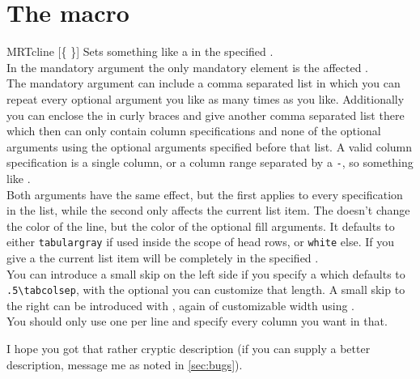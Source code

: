 \section{The  macro}\label{sec:tab:cline}%
\begin{describemacro}{MRTcline}%
  [\{\meta{*}%
  \}]
  Sets something like a  in the specified .
  \\[\parskip]
  In the mandatory argument the only mandatory element is the affected
  .
  \\[\parskip]
  The mandatory argument can include a comma separated list in which you can
  repeat every optional argument you like as many times as you like.
  Additionally you can enclose the  in curly braces and give another
  comma separated list there which then can only contain column specifications
  and none of the optional arguments using the optional arguments specified
  before that list. A valid column specification is a single column, or a column
  range separated by a \texttt{-}, so something like .
  \\[\parskip]
  Both  arguments have the same effect, but the first applies to
  every specification in the list, while the second only affects the current
  list item. The  doesn't change the color of the line, but the
  color of the optional fill arguments. It defaults to either
  \texttt{tabulargray} if used inside the scope of head rows, or \texttt{white}
  else. If you give a \meta{*} the current list item will be completely in the
  specified .
  \\[\parskip]
  You can introduce a small skip on the left side if you specify a \meta{<}
  which defaults to \verb|.5\tabcolsep|, with the optional  you
  can customize that length. A small skip to the right can be introduced with
  \meta{>}, again of customizable width using .
  \\[\parskip]
  You should only use one  per line and specify every column you
  want in that.
\end{describemacro}%

I hope you got that rather cryptic description (if you can supply a better
description, message me as noted in \autoref{sec:bugs}).


